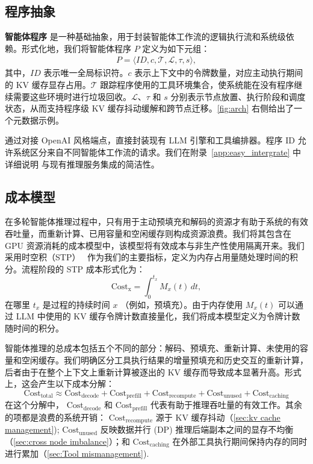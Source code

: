 \subsection{程序抽象}
\label{sec:program_definition}
\textbf{智能体程序} 是一种基础抽象，用于封装智能体工作流的逻辑执行流和系统级依赖。形式化地，我们将智能体程序 $P$ 定义为如下元组：
\begin{align}
P = \langle \mathit{ID}, c, \mathcal{T}, \mathcal{L}, \tau, s \rangle,
\end{align}
\noindent 其中，$\mathit{ID}$ 表示唯一全局标识符。$c$ 表示上下文中的令牌数量，对应主动执行期间的 KV 缓存显存占用。$\mathcal{T}$ 跟踪程序使用的工具环境集合，使系统能在没有程序继续需要这些环境时进行垃圾回收。$\mathcal{L}$、$\tau$ 和 $s$ 分别表示节点放置、执行阶段和调度状态，从而支持程序级 KV 缓存抖动缓解和跨节点迁移。\autoref{fig:arch} 右侧给出了一个元数据示例。

\ouralg 通过对接 OpenAI 风格端点，直接封装现有 LLM 引擎和工具编排器。程序 ID 允许系统区分来自不同智能体工作流的请求。我们在附录~\ref{app:easy_intergrate} 中详细说明 \ouralg 与现有推理服务集成的简洁性。

\subsection{成本模型}
\label{sec:utility_model}

在多轮智能体推理过程中，只有用于主动预填充和解码的资源才有助于系统的有效吞吐量，而重新计算、已用容量和空闲缓存则构成资源浪费。我们将其包含在 GPU 资源消耗的成本模型中，该模型将有效成本与非生产性使用隔离开来。我们采用时空积（STP）~\citep{5388441} 作为我们的主要指标，定义为内存占用量随处理时间的积分。流程阶段的 STP 成本形式化为：
\begin{equation}
    \text{Cost}_{\text{x}} = \int_{0}^{t_{x}} M_x(t) \, dt,
\end{equation}
\noindent 在哪里 $t_x$ 是过程的持续时间 $x$ （例如，预填充）。由于内存使用 $M_x(t)$ 可以通过 LLM 中使用的 KV 缓存令牌计数直接量化，我们将成本模型定义为令牌计数随时间的积分。

智能体推理的总成本包括五个不同的部分：解码、预填充、重新计算、未使用的容量和空闲缓存。我们明确区分工具执行结果的增量预填充和历史交互的重新计算，后者由于在整个上下文上重新计算被逐出的 KV 缓存而导致成本显著升高。形式上，这会产生以下成本分解：
\begin{equation}
    \text{Cost}_{\text{total}} \approx \text{Cost}_{\text{decode}} + \text{Cost}_{\text{prefill}} + \text{Cost}_{\text{recompute}} +
    \text{Cost}_{\text{unused}} + \text{Cost}_{\text{caching}}
    \label{eq:cost_decomp}
\end{equation}
\noindent 在这个分解中， $\text{Cost}_{\text{decode}}$ 和  $\text{Cost}_{\text{prefill}}$ 代表有助于推理吞吐量的有效工作。其余的项都是浪费的系统开销： $\text{Cost}_{\text{recompute}}$ 源于 KV 缓存抖动（\autoref{sec:kv cache management}); $\text{Cost}_{\text{unused}}$ 反映数据并行 (DP) 推理后端副本之间的显存不均衡（\autoref{sec:cross node imbalance}）；和 $\text{Cost}_{\text{caching}}$ 在外部工具执行期间保持内存的同时进行累加（\autoref{sec:Tool mismanagement}).

